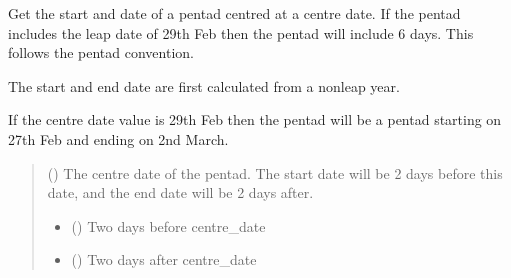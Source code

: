 \documentclass[letterpaper,10pt,english]{sphinxmanual}
\begin{document}
\begin{fulllineitems}
\label{\detokenize{misc:glomar_gridding.utils.get_pentad_range}}
\pysigstartsignatures
\pysiglinewithargsret
{}
{}
{}
\pysigstopsignatures
\sphinxAtStartPar
Get the start and date of a pentad centred at a centre date. If the
pentad includes the leap date of 29th Feb then the pentad will include
6 days. This follows the \sphinxstylestrong{*} pentad convention.

\sphinxAtStartPar
The start and end date are first calculated from a non\sphinxhyphen{}leap year.

\sphinxAtStartPar
If the centre date value is 29th Feb then the pentad will be a pentad
starting on 27th Feb and ending on 2nd March.
\begin{quote}\begin{description}
\sphinxAtStartPar
{} () \textendash{} The centre date of the pentad. The start date will be 2 days before this
date, and the end date will be 2 days after.

\sphinxAtStartPar
{}

\sphinxAtStartPar
\begin{itemize}
\item {}
\sphinxAtStartPar
{} () \textendash{} Two days before centre\_date

\item {}
\sphinxAtStartPar
{} () \textendash{} Two days after centre\_date

\end{itemize}


\end{description}\end{quote}

\end{fulllineitems}

\end{document}
